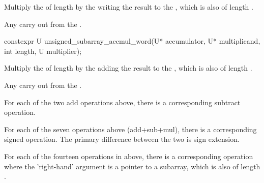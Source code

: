 \begin{addedblock}
\begin{itemdescr}
\effects Multiply the  of length  by the  writing the result to the , which is also of length .

\returns Any carry out from the .
\end{itemdescr}

\begin{itemdecl}
constexpr U unsigned_subarray_accmul_word(U* accumulator, U* multiplicand, int length, U multiplier);
\end{itemdecl}

\begin{itemdescr}
\effects Multiply the  of length  by the  adding the result to the , which is also of length .

\returns Any carry out from the .
\end{itemdescr}

For each of the two add operations above, there is a corresponding subtract operation.

For each of the seven operations above (add+sub+mul), there is a corresponding signed operation. The primary difference between the two is sign extension.

For each of the fourteen operations in above, there is a corresponding operation where the 'right-hand' argument is a pointer to a subarray, which is also of length .
\end{addedblock}
